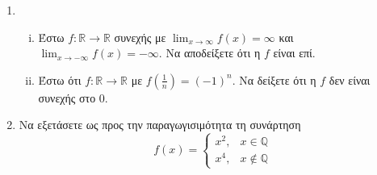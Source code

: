 \documentclass[a4paper,table]{report}
\begin{document}
\begin{enumerate}
    \item 
        \begin{enumerate}[i)]
            \item Έστω $ f \colon \mathbb{R} \to \mathbb{R} $ συνεχής με 
                $ \lim_{x \to \infty} f(x) = \infty$ και $ \lim_{x \to - \infty} f(x) 
                = - \infty $. Να αποδείξετε ότι η $f$ είναι επί.

            \item Έστω ότι $ f \colon \mathbb{R} \to \mathbb{R} $ με $ f(\frac{1}{n}) 
                = (-1)^{n} $. Να δείξετε ότι η $f$ δεν είναι συνεχής στο 0.
        \end{enumerate}

    \item Να εξετάσετε ως προς την παραγωγισιμότητα τη συνάρτηση
        \[
            f(x) = 
            \begin{cases} 
                x^{2}, & x \in \mathbb{Q} \\ 
                x^{4}, & x \not \in \mathbb{Q} 
            \end{cases} 
         \] 
\end{enumerate}
\end{document}

